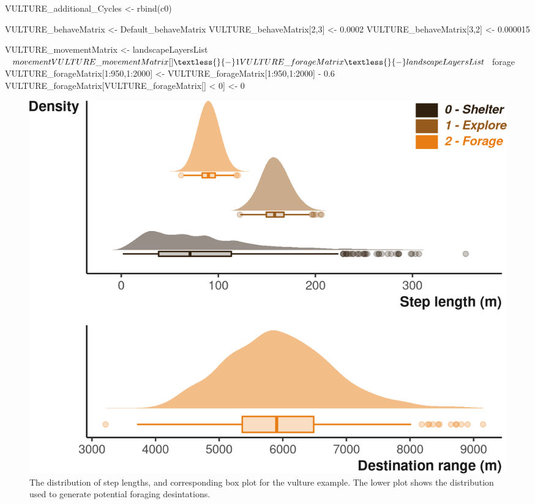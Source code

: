 \documentclass[10pt,a4paper]{article}
\newenvironment{Shaded}{}{}
\newcommand{\DecValTok}[1]{#1}
\newcommand{\FloatTok}[1]{#1}
\newcommand{\FunctionTok}[1]{#1}
\newcommand{\NormalTok}[1]{#1}
\newcommand{\OtherTok}[1]{#1}
\newcommand{\SpecialCharTok}[1]{#1}
\begin{document}
\begin{Shaded}
\begin{Highlighting}[]
\NormalTok{VULTURE\_additional\_Cycles }\OtherTok{\textless{}{-}} \FunctionTok{rbind}\NormalTok{(c0)}

\NormalTok{VULTURE\_behaveMatrix }\OtherTok{\textless{}{-}}\NormalTok{ Default\_behaveMatrix}
\NormalTok{VULTURE\_behaveMatrix[}\DecValTok{2}\NormalTok{,}\DecValTok{3}\NormalTok{] }\OtherTok{\textless{}{-}} \FloatTok{0.0002}
\NormalTok{VULTURE\_behaveMatrix[}\DecValTok{3}\NormalTok{,}\DecValTok{2}\NormalTok{] }\OtherTok{\textless{}{-}} \FloatTok{0.000015}


\NormalTok{VULTURE\_movementMatrix }\OtherTok{\textless{}{-}}\NormalTok{ landscapeLayersList}\SpecialCharTok{$}\NormalTok{movement}
\NormalTok{VULTURE\_movementMatrix[] }\OtherTok{\textless{}{-}} \DecValTok{1}


\NormalTok{VULTURE\_forageMatrix }\OtherTok{\textless{}{-}}\NormalTok{ landscapeLayersList}\SpecialCharTok{$}\NormalTok{forage}
\NormalTok{VULTURE\_forageMatrix[}\DecValTok{1}\SpecialCharTok{:}\DecValTok{950}\NormalTok{,}\DecValTok{1}\SpecialCharTok{:}\DecValTok{2000}\NormalTok{] }\OtherTok{\textless{}{-}}\NormalTok{ VULTURE\_forageMatrix[}\DecValTok{1}\SpecialCharTok{:}\DecValTok{950}\NormalTok{,}\DecValTok{1}\SpecialCharTok{:}\DecValTok{2000}\NormalTok{] }\SpecialCharTok{{-}} \FloatTok{0.6}
\NormalTok{VULTURE\_forageMatrix[VULTURE\_forageMatrix[] }\SpecialCharTok{\textless{}} \DecValTok{0}\NormalTok{] }\OtherTok{\textless{}{-}} \DecValTok{0}
\end{Highlighting}
\end{Shaded}

\begin{figure}

{\centering \includegraphics{Agent-based_model_walkthrough_files/figure-latex/VULTUREsettingMoveDesPlot-1} 

}

\caption{The distribution of step lengths, and corresponding box plot for the vulture example. The lower plot shows the distribution used to generate potential foraging desintations.}\label{fig:VULTUREsettingMoveDesPlot}
\end{figure}
\end{document}
